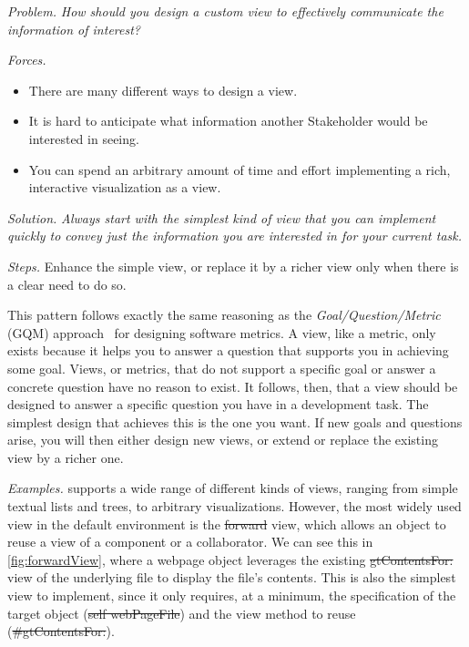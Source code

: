 \documentclass[acmsmall,screen,authorversion,nonacm]{acmart} %
\newcommand\cp[1]{\nbe{Cesare}{#1}{olive}} %
\newcommand{\GT}{\lst{GT}\xspace} %
\newcommand{\patsec}[1]{\noindent\textit{#1.}\xspace}
\begin{document}
\patsec{Problem}
\emph{How should you design a custom view to effectively communicate the information of interest?}

\patsec{Forces}
\begin{itemize}[---]
\item There are many different ways to design a view.
\item It is hard to anticipate what information another Stakeholder would be interested in seeing.
\item You can spend an arbitrary amount of time and effort implementing a rich, interactive visualization as a view.
\end{itemize}

\patsec{Solution}
\emph{Always start with the simplest kind of view that you can implement quickly to convey just the information you are interested in for your current task.}

\patsec{Steps}
Enhance the simple view, or replace it by a richer view only when there is a clear need to do so.

This pattern follows exactly the same reasoning as the \emph{Goal/Question/Metric} (GQM) approach~\cite{Basi94a} for designing software metrics.
A view, like a metric, only exists because it helps you to answer a question that supports you in achieving some goal.
Views, or metrics, that do not support a specific goal or answer a concrete question have no reason to exist.
It follows, then, that a view should be designed to answer a specific question you have in a development task.
The simplest design that achieves this is the one you want.
If new goals and questions arise, you will then either design new views, or extend or replace the existing view by a richer one.

\patsec{Examples}
\GT supports a wide range of different kinds of views, ranging from simple textual lists and trees, to arbitrary visualizations.
However, the most widely used view in the default environment is the \st{forward} view, which allows an object to reuse a view of a component or a collaborator.
We can see this in \autoref{fig:forwardView}, where a webpage object leverages the existing \st{gtContentsFor:} view of the underlying file to display the file's contents.
This is also the simplest view to implement, since it only requires, at a minimum, the specification of the target object (\st{self webPageFile}) and the view method to reuse (\st{#gtContentsFor:}).
\end{document}
